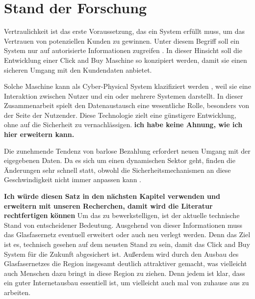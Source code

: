 \section{Stand der Forschung}

Vertraulichkeit ist das erste Voraussetzung, das ein System erfüllt muss, um das Vertrauen 
von potenziellen Kunden zu gewinnen. Unter diesem Begriff soll ein System nur auf autorisierte
Informationen zugreifen \cite{refbook:SWIS}. In dieser Hinsicht soll die Entwicklung einer
Click and Buy Maschine so konzipiert werden, damit sie einen sicheren Umgang mit den Kundendaten
anbietet.


Solche Maschine kann als Cyber-Physical System klazifiziert werden \cite{inbook:MHNS}, weil sie 
eine Interaktion zwischen Nutzer und ein oder mehrere Systemen darstellt. In dieser Zusammenarbeit
spielt den Datenaustausch eine wesentliche Rolle, besonders von der Seite der Nutzender. 
Diese Technologie zielt eine günstigere Entwicklung, ohne auf die Sicherheit zu vernachlässigen.
\textbf{ich habe keine Ahnung, wie ich hier erweitern kann.}


Die zunehmende Tendenz von barlose Bezahlung erfordert neuen Umgang mit der eigegebenen Daten. Da es sich
um einen dynamischen Sektor geht, finden die Änderungen sehr schnell statt, obwohl die Sicherheitsmechanismen
an diese Geschwindigkeit nicht immer anpassen kann \cite{refbook:MNIT}.






\textbf{Ich würde diesen Satz in den nächsten Kapitel verwenden und erweitern mit unseren Recherchen, damit wird 
die Literatur rechtfertigen können}
Um das zu bewerkstelligen, ist der aktuelle technische Stand von entscheidener Bedeutung. 
Ausgehend von dieser Informationen muss das Glasfasernetz eventuell erweitert oder auch neu verlegt werden.
Denn das Ziel ist es, technisch gesehen auf dem neusten Stand zu sein, damit das Click and Buy System für die Zukunft abgesichert ist.
Außerdem wird durch den Ausbau des Glasfasernetzes die Region insgesamt deutlich attraktiver gemacht, was vielleicht auch Menschen dazu bringt
in diese Region zu ziehen. Denn jedem ist klar, dass ein guter Internetausbau essentiell ist, um vielleicht auch mal von zuhause aus zu arbeiten.